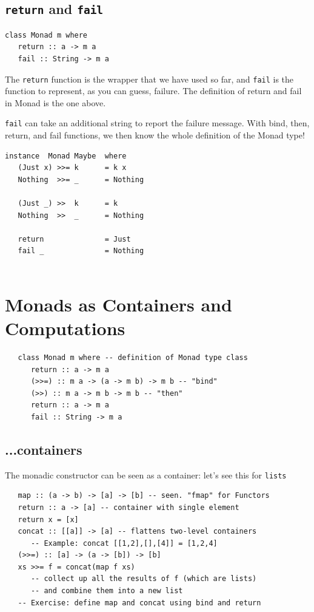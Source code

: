 \subsection{\texttt{return} and \texttt{fail}}
\begin{lstlisting}
class Monad m where
   return :: a -> m a
   fail :: String -> m a 
\end{lstlisting}
The \lstinline|return| function is the wrapper that we have used so far, and \lstinline|fail| is the function to represent, as you can guess, failure. The definition of return and fail in Monad is the one above.

\lstinline|fail| can take an additional string to report the failure message. With bind, then, return, and fail functions, we then know the whole definition of the Monad type!

\begin{lstlisting}
instance  Monad Maybe  where
   (Just x) >>= k      = k x
   Nothing  >>= _      = Nothing

   (Just _) >>  k      = k
   Nothing  >>  _      = Nothing

   return              = Just
   fail _              = Nothing


\end{lstlisting}

\section{Monads as Containers and Computations}
\begin{lstlisting}
   class Monad m where -- definition of Monad type class
      return :: a -> m a
      (>>=) :: m a -> (a -> m b) -> m b -- "bind"
      (>>) :: m a -> m b -> m b -- "then"
      return :: a -> m a
      fail :: String -> m a
\end{lstlisting}
\subsection{...containers}

The monadic constructor can be seen as a container:
let’s see this for \lstinline|lists|

\begin{lstlisting}
   map :: (a -> b) -> [a] -> [b] -- seen. "fmap" for Functors
   return :: a -> [a] -- container with single element
   return x = [x]
   concat :: [[a]] -> [a] -- flattens two-level containers
      -- Example: concat [[1,2],[],[4]] = [1,2,4]
   (>>=) :: [a] -> (a -> [b]) -> [b]
   xs >>= f = concat(map f xs)
      -- collect up all the results of f (which are lists)
      -- and combine them into a new list
   -- Exercise: define map and concat using bind and return
\end{lstlisting}

